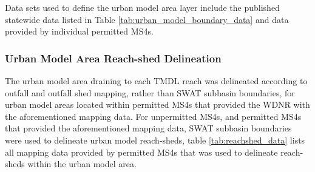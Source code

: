Data sets used to define the urban model area layer include the published statewide data listed in Table \ref{tab:urban_model_boundary_data} and data provided by individual permitted MS4s.

\subsubsection{Urban Model Area Reach-shed Delineation}

The urban model area draining to each TMDL reach was delineated according to outfall and outfall shed mapping, rather than SWAT subbasin boundaries, for urban model areas located within permitted MS4s that provided the WDNR with the aforementioned mapping data. 
For unpermitted MS4s, and permitted MS4s that provided the aforementioned mapping data, SWAT subbasin boundaries were used to delineate urban model reach-sheds, table \ref{tab:reachshed_data} lists all mapping data provided by permitted MS4s that was used to delineate reach-sheds within the urban model area.  



